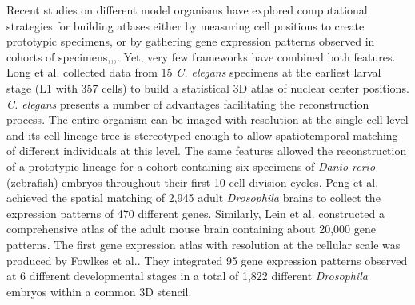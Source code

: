 Recent studies on different model organisms have explored computational strategies for building atlases either by measuring cell positions to create prototypic specimens\cite{long20093d},\cite{olivier2010cell} or by gathering gene expression patterns observed in cohorts of specimens\cite{lein2007genome},\cite{fowlkes2008quantitative},\cite{peng2011brainaligner},\cite{asadulina2012whole}. Yet, very few frameworks have combined both features. Long et al.\cite{long20093d} collected data from 15 \emph{C. elegans} specimens at the earliest larval stage (L1 with 357 cells) to build a statistical 3D atlas of nuclear center positions. \emph{C. elegans} presents a number of advantages facilitating the reconstruction process. The entire organism can be imaged with resolution at the single-cell level and its cell lineage tree is stereotyped enough to allow spatiotemporal matching of different individuals at this level. The same features allowed the reconstruction of a prototypic lineage for a cohort containing six specimens of \emph{Danio rerio} (zebrafish) embryos throughout their first 10 cell division cycles\cite{olivier2010cell}. Peng et al.\cite{peng2011brainaligner} achieved the spatial matching of 2,945 adult \emph{Drosophila} brains to collect the expression patterns of 470 different genes. Similarly, Lein et al.\cite{lein2007genome} constructed a comprehensive atlas of the adult mouse brain containing about 20,000 gene patterns. The first gene expression atlas with resolution at the cellular scale was produced by Fowlkes et al.\cite{fowlkes2008quantitative}. They integrated 95 gene expression patterns observed at 6 different developmental stages in a total of 1,822 different \emph{Drosophila} embryos within a common 3D stencil.

